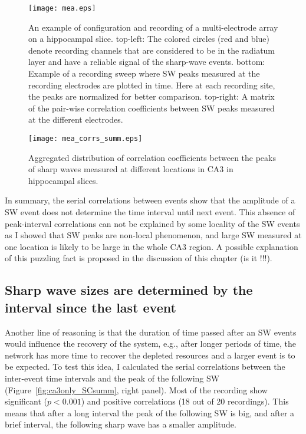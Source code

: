     \begin{figure}
      \texttt{[image: mea.eps]}
      \caption{
        An example of configuration and recording of a multi-electrode array on
        a hippocampal slice. top-left: The colored circles (red and blue)
        denote recording channels that are considered to be in the radiatum
        layer and have a reliable signal of the sharp-wave events. bottom:
        Example of a recording sweep where SW peaks measured at the recording
        electrodes are plotted in time. Here at each recording site, the peaks
        are normalized for better comparison. top-right: A matrix of the
        pair-wise correlation coefficients between SW peaks measured at the
        different electrodes.
      }
    \label{fig:peak_correlation_ex}
    \end{figure}

    \begin{figure}
      \texttt{[image: mea\_corrs\_summ.eps]}
      \caption{
              Aggregated distribution of correlation coefficients between the
              peaks of sharp waves measured at different locations in CA3 in
              hippocampal slices.
             }
    \label{fig:peak_correlation_summ}
    \end{figure}
    
    In summary, the serial correlations between events show that the amplitude
    of a SW event does not determine the time interval until next event. This
    absence of peak-interval correlations can not be explained by some locality
    of the SW events as I showed that SW peaks are non-local phenomenon, and
    large SW measured at one location is likely to be large in the whole CA3
    region. A possible explanation of this puzzling fact is proposed in the
    discussion of this chapter (is it !!!). 

  \subsection{Sharp wave sizes are determined by the interval since the last event}

    Another line of reasoning is that the duration of time passed after an SW
    events would influence the recovery of the system, e.g., after longer
    periods of time, the network has more time to recover the depleted
    resources and a larger event is to be expected. To test this idea, I
    calculated the serial correlations between the inter-event time intervals
    and the peak of the following SW (Figure~\ref{fig:ca3only_SCsumm}, right
    panel). Most of the recording show significant ($p<0.001$) and positive
    correlations (18 out of 20 recordings). This means that after a long
    interval the peak of the following SW is big, and after a brief interval,
    the following sharp wave has a smaller amplitude. 

